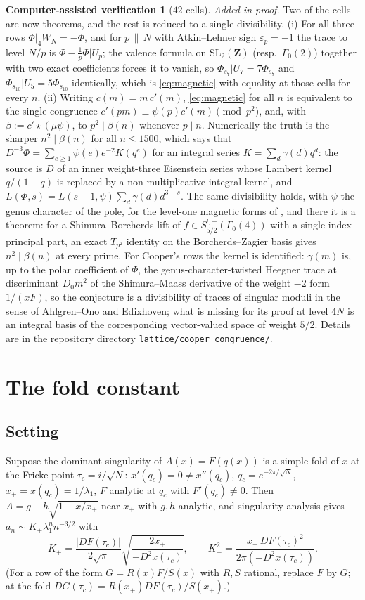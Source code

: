\documentclass[11pt]{amsart}
\theoremstyle{definition}
\newtheorem{verification}[theorem]{Computer-assisted verification}
\theoremstyle{remark}
\begin{document}
\begin{verification}[$42$ cells]
\emph{Added in proof.} Two of the cells are now theorems, and the rest is reduced to a single divisibility. (i) For all three rows $\Phi|_4W_N=-\Phi$, and for $p\,\|\,N$ with Atkin--Lehner sign $\varepsilon_p=-1$ the trace to level $N/p$ is $\Phi-\frac1p\Phi|U_p$; the valence formula on $\mathrm{SL}_2(\mathbf Z)$ (resp.\ $\Gamma_0(2)$) together with two exact coefficients forces it to vanish, so $\Phi_{s_7}|U_7=7\Phi_{s_7}$ and $\Phi_{s_{10}}|U_5=5\Phi_{s_{10}}$ identically, which is \eqref{eq:magnetic} with equality at those cells for every $n$. (ii) Writing $c(m)=m\,c'(m)$, \eqref{eq:magnetic} for all $n$ is equivalent to the single congruence $c'(pm)\equiv\psi(p)c'(m)\pmod{p^2}$, and, with $\beta:=c'\star(\mu\psi)$, to $p^2\mid\beta(n)$ whenever $p\mid n$. Numerically the truth is the sharper $n^2\mid\beta(n)$ for all $n\le1500$, which says that $D^{-3}\Phi=\sum_{e\ge1}\psi(e)e^{-2}K(q^e)$ for an integral series $K=\sum_d\gamma(d)q^d$: the source is $D$ of an inner weight-three Eisenstein series whose Lambert kernel $q/(1-q)$ is replaced by a non-multiplicative integral kernel, and $L(\Phi,s)=L(s-1,\psi)\sum_d\gamma(d)d^{3-s}$. The same divisibility holds, with $\psi$ the genus character of the pole, for the level-one magnetic forms of \cite{PasolZudilin}, and there it is a theorem: for a Shimura--Borcherds lift of $f\in S^{!,+}_{5/2}(\Gamma_0(4))$ with a single-index principal part, an exact $T_{p^2}$ identity on the Borcherds--Zagier basis gives $n^2\mid\beta(n)$ at every prime. For Cooper's rows the kernel is identified: $\gamma(m)$ is, up to the polar coefficient of $\Phi$, the genus-character-twisted Heegner trace at discriminant $D_0m^2$ of the Shimura--Maass derivative of the weight $-2$ form $1/(xF)$, so the conjecture is a divisibility of traces of singular moduli in the sense of Ahlgren--Ono and Edixhoven; what is missing for its proof at level $4N$ is an integral basis of the corresponding vector-valued space of weight $5/2$. Details are in the repository directory \texttt{lattice/cooper\_congruence/}.
\end{verification}

\section{The fold constant}\label{sec:fold}

\subsection{Setting}
Suppose the dominant singularity of $A(x)=F(q(x))$ is a simple fold of $x$ at the Fricke point $\tau_c=i/\sqrt N$: $x'(q_c)=0\ne x''(q_c)$, $q_c=e^{-2\pi/\sqrt N}$, $x_+=x(q_c)=1/\lambda_1$, $F$ analytic at $q_c$ with $F'(q_c)\ne0$. Then $A=g+h\sqrt{1-x/x_+}$ near $x_+$ with $g,h$ analytic, and singularity analysis gives $a_n\sim K_+\lambda_1^nn^{-3/2}$ with
\begin{equation}\label{eq:fold}
K_+=\frac{|DF(\tau_c)|}{2\sqrt\pi}\sqrt{\frac{2x_+}{-D^2x(\tau_c)}},\qquad K_+^2=\frac{x_+\,DF(\tau_c)^2}{2\pi(-D^2x(\tau_c))}.
\end{equation}
(For a row of the form $G=R(x)F/S(x)$ with $R,S$ rational, replace $F$ by $G$; at the fold $DG(\tau_c)=R(x_+)DF(\tau_c)/S(x_+)$.)
\end{document}
